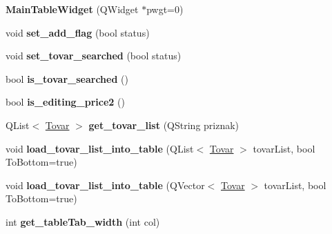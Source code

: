 \begin{DoxyCompactItemize}
\item 
\hypertarget{class_main_table_widget_a990fb33031d5f0fe226aac38c5859594}{{\bfseries \-Main\-Table\-Widget} (\-Q\-Widget $\ast$pwgt=0)}\label{class_main_table_widget_a990fb33031d5f0fe226aac38c5859594}

\item 
\hypertarget{class_main_table_widget_a7d2fb4035c92e9e8f588db4ceb1e64f5}{void {\bfseries set\-\_\-add\-\_\-flag} (bool status)}\label{class_main_table_widget_a7d2fb4035c92e9e8f588db4ceb1e64f5}

\item 
\hypertarget{class_main_table_widget_a0e0c896141f00e20513ba183eb1969e4}{void {\bfseries set\-\_\-tovar\-\_\-searched} (bool status)}\label{class_main_table_widget_a0e0c896141f00e20513ba183eb1969e4}

\item 
\hypertarget{class_main_table_widget_afd1a8af2f4ac94510ca97a4ade29c0b9}{bool {\bfseries is\-\_\-tovar\-\_\-searched} ()}\label{class_main_table_widget_afd1a8af2f4ac94510ca97a4ade29c0b9}

\item 
\hypertarget{class_main_table_widget_afd07c745c0da54535ffffe88c09174ca}{bool {\bfseries is\-\_\-editing\-\_\-price2} ()}\label{class_main_table_widget_afd07c745c0da54535ffffe88c09174ca}

\item 
\hypertarget{class_main_table_widget_a561a8875a742acce517588f1db4c6178}{\-Q\-List$<$ \hyperlink{struct_tovar}{\-Tovar} $>$ {\bfseries get\-\_\-tovar\-\_\-list} (\-Q\-String priznak)}\label{class_main_table_widget_a561a8875a742acce517588f1db4c6178}

\item 
\hypertarget{class_main_table_widget_a766c2004021d148339c1ed473ba88192}{void {\bfseries load\-\_\-tovar\-\_\-list\-\_\-into\-\_\-table} (\-Q\-List$<$ \hyperlink{struct_tovar}{\-Tovar} $>$ tovar\-List, bool \-To\-Bottom=true)}\label{class_main_table_widget_a766c2004021d148339c1ed473ba88192}

\item 
\hypertarget{class_main_table_widget_a6bfc6a0806ca69fc9e9218e9924a9228}{void {\bfseries load\-\_\-tovar\-\_\-list\-\_\-into\-\_\-table} (\-Q\-Vector$<$ \hyperlink{struct_tovar}{\-Tovar} $>$ tovar\-List, bool \-To\-Bottom=true)}\label{class_main_table_widget_a6bfc6a0806ca69fc9e9218e9924a9228}

\item 
\hypertarget{class_main_table_widget_a587031356f7a6e4c9d209eea1b6e94d9}{int {\bfseries get\-\_\-table\-Tab\-\_\-width} (int col)}\label{class_main_table_widget_a587031356f7a6e4c9d209eea1b6e94d9}


\end{DoxyCompactItemize}
